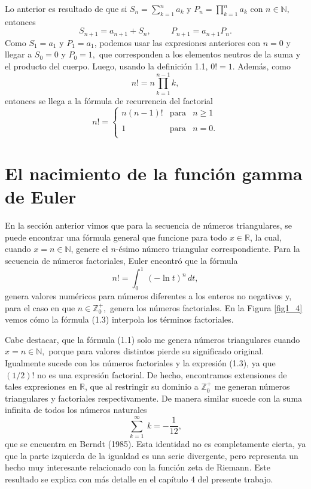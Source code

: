 Lo anterior es resultado de que si $S_n = \sum_{k=1}^{n} a_k$ y $P_n = \prod_{k=1}^{n} a_k$ con $n \in \mathbb{N},$ entonces
$$S_{n+1} = a_{n+1}+S_n, \hspace{1cm} P_{n+1} = a_{n+1}P_n.$$
Como $S_1 = a_1$ y $P_1 = a_1$, podemos usar las expresiones anteriores con $n = 0$ y llegar a $S_0 = 0$ y $P_0 = 1,$ que corresponden a los elementos neutros de la suma y el producto del cuerpo. Luego, usando la definición 1.1, $0! = 1.$ Además, como $$n! = n \prod_{k=1}^{n-1} k,$$ entonces se llega a la fórmula de recurrencia del factorial
\begin{equation}
	n! = \left\{ \begin{array}{rcl}
	n(n-1)! & \mbox{para} & n\geq1\\
	&				&\\
	1 & \mbox{para} & n = 0.\\
	\end{array}\right.
\end{equation}

\section{El nacimiento de la función gamma de Euler}

En la sección anterior vimos que para la secuencia de números triangulares, se puede encontrar una fórmula general que funcione para todo $x \in \mathbb{R}$, la cual, cuando $x = n \in \mathbb{N}$, genere el $n$-ésimo número triangular correspondiente. Para la secuencia de números factoriales, Euler encontró que la fórmula
\begin{equation}
	n! = \int_{0}^{1}\, (-\ln t)^n\, dt, 
\end{equation}
genera valores numéricos para números diferentes a los enteros no negativos y, para el caso en que $n \in \mathbb{Z}_0^+,$ genera los números factoriales. En la Figura \ref{fig1_4} vemos cómo la fórmula (1.3) interpola los términos factoriales. 

Cabe destacar, que la fórmula (1.1) solo me genera números triangulares cuando $x = n \in\mathbb{N},$ porque para valores distintos pierde su significado original. Igualmente sucede con los números factoriales y la expresión (1.3), ya que $(1/2)!$ no es una expresión factorial. De hecho, encontramos extensiones de tales expresiones en $\mathbb{R}$, que al restringir su dominio a $\mathbb{Z}_0^+$ me generan números triangulares y factoriales respectivamente. De manera similar sucede con la suma infinita de todos los números naturales $$\sum_{k=1}^{\infty}\ k = -\frac{1}{12},$$ que se encuentra en Berndt (1985). Esta identidad no es completamente cierta, ya que la parte izquierda de la igualdad es una serie divergente, pero representa un hecho muy interesante relacionado con la función zeta de Riemann. Este resultado se explica con más detalle en el capítulo 4 del presente trabajo. 

